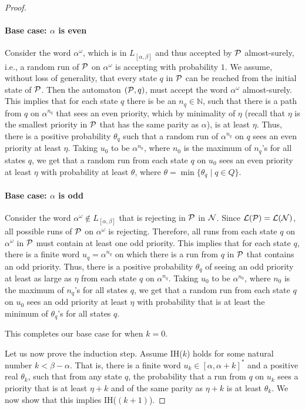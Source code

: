 \begin{proof}
    \paragraph*{Base case: $\alpha$ is even} Consider the word $\alpha^{\omega}$, which is in $L_{[\alpha,\beta]}$ and thus accepted by $\mathcal{P}$ almost-surely, i.e., a random run of $\mathcal{P}$ on $\alpha^{\omega}$ is accepting with probability $1$. We assume, without loss of generality, that every state $q$ in $\mathcal{P}$ can be reached from the initial state of $\mathcal{P}$. Then the automaton $(\mathcal{P},q)$, must accept the word $\alpha^{\omega}$ almost-surely. This implies that for each state $q$ there is be an $n_q \in \mathbb{N}$, such that there is a path from $q$ on $\alpha^{n_q}$ that sees an even priority, which by minimality of $\eta$ (recall that $\eta$ is the smallest priority in $\mathcal{P}$ that has the same parity as $\alpha$), is at least $\eta$. Thus, there is a positive probability $\theta_q$ such that a random run of $\alpha^{n_q}$ on $q$ sees an even priority at least $\eta$. Taking $u_0$ to be $\alpha^{n_0}$, where  $n_0$ is the maximum of $n_q$'s for all states $q$, we get that a random run from each state $q$ on $u_0$ sees an even priority at least $\eta$ with probability at least $\theta$, where $\theta =\min \{\theta_q \mid q \in Q\}$.

    \paragraph*{Base case: $\alpha$ is odd} Consider the word $\alpha^{\omega} \notin L_{[\alpha,\beta]}$ that is rejecting in $\mathcal{P}$ in $\mathcal{N}$. Since $\mathcal{L}(\mathcal{P}) = \mathcal{L}(\mathcal{N})$, all possible runs of $\mathcal{P}$ on $\alpha^{\omega}$ is rejecting. Therefore, all runs from each state $q$ on $\alpha^{\omega}$ in $\mathcal{P}$ must contain at least one odd priority. This implies that for each state $q$, there is a finite word $u_q=\alpha^{n_q}$ on which there is a run from $q$ in $\mathcal{P}$ that contains an odd priority. Thus, there is a positive probability $\theta_q$ of seeing an odd priority at least as large as $\eta$ from each state $q$ on $\alpha^{n_q}$. Taking $u_0$ to be $\alpha^{n_0}$, where  $n_0$ is the maximum of $n_q$'s for all states $q$, we get that a random run from each state $q$ on $u_0$ sees an odd priority at least $\eta$ with probability that is at least the minimum of $\theta_q$'s for all states $q$. 

    This completes our base case for when $k=0$. 
    
    Let us now prove the induction step. Assume IH($k$) holds for some natural number $k<\beta-\alpha$. That is, there is a finite word $u_k \in [\alpha,\alpha+k]^{*}$ and a positive real $\theta_k$, such that from any state $q$, the probability that a run from $q$ on $u_k$ sees a priority that is at least $\eta+k$ and of the same parity as $\eta+k$ is at least $\theta_k$. We now show that this implies IH($(k+1)$).


\end{proof}
